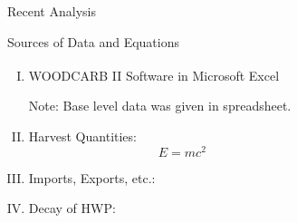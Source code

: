 \documentclass[final]{beamer}\usepackage[]{graphicx}\usepackage[]{color}
\newlength{\sepwid}
\newlength{\onecolwid}
\newlength{\twocolwid}
\begin{document}
\begin{frame}[t]
\begin{columns}[t]
\begin{column}{\onecolwid}
\begin{block}{Recent Analysis}
\end{block}
\begin{block}{Sources of Data and Equations}

\begin{enumerate}[I.]
\item WOODCARB II Software in Microsoft Excel\textsuperscript{\textregistered}

\vspace{0ex}
Note: Base level data was given in spreadsheet. 
\item Harvest Quantities: 
\begin{equation}
E = mc^{2}
\label{eqn:Einstein}
\end{equation}
\item Imports, Exports, etc.:
\item Decay of HWP:
\end{enumerate}
\vspace{0ex}

\end{block}
\vfill



\end{column} %

\begin{column}{\sepwid}\end{column} %

\begin{column}{\twocolwid} %

\begin{columns}[t,totalwidth=\twocolwid] %

\begin{column}{\onecolwid}\vspace{-.6in} %




\end{column}
\end{columns}
\end{column}
\end{columns}
\end{frame}
\end{document}
